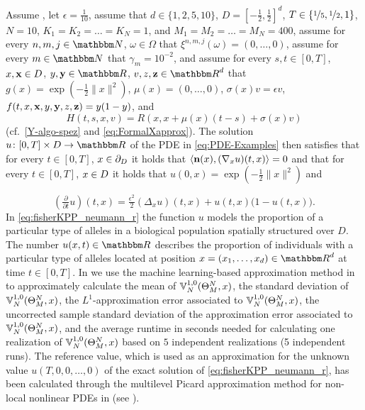 Assume ,
let 
$\epsilon = \tfrac{1}{10}$,
assume that
$d\in\{1,2,5,10\}$,
$D = [-\tfrac{1}{2},\tfrac{1}{2}]^d$,
$T\in\{\nicefrac{1}{5},\nicefrac{1}{2},1\}$,
$N=10$,
$K_1 = K_2 = \ldots = K_N= 1$, and
$M_1 = M_2 = \ldots = M_N = 400$,
assume for every 
$n,m,j\in \N$, $\omega \in \Omega$ 
that 
$\xi^{n,m,j}(\omega)=(0,\dots,0)$,
assume for every 
$m \in \N$
that
$\gamma_m = 10^{-2}$,
and assume for every 
$s,t \in [0,T]$,
$x,{\textbf x} \in D$,
$y,{\textbf y} \in \R$,
$v,z, {\textbf z} \in \R^d$ 
that
$g(x)=  \exp (-\tfrac{1}{2}\|x\|^2)$,
$\mu(x)=(0,\dots,0)$,
$\sigma(x) v =\epsilon v$, 
$f(t,x,{\textbf x},y,{\textbf y}, z, {\textbf z})= y(1-y)$, and
\begin{equation}
	H(t,s,x,v) = R(x,x+\mu(x)(t-s)+\sigma(x)v)
\end{equation} 
(cf.\ \eqref{Y-algo-spez} and \eqref{eq:FormalXapprox}).
The solution $u\colon[0,T]\times \D \to \R$ of the PDE in \eqref{eq:PDE-Examples} then satisfies that for every
$t\in [0,T]$, $x\in\partial_D$
it holds that
$\left<{\textbf n}(x) ,(\nabla_x u)(t,x)\right> = 0$
and that for every
$t\in [0,T]$, $x\in D$
it holds that
$u(0,x) =  \exp (-\tfrac{1}{2}\|x\|^2)$ and

\begin{equation}
    (\tfrac{\partial }{\partial t}u) (t,x) =
			\tfrac{\epsilon^2}{2}(\Delta_x u) (t,x) +
			u(t,x)\big(1 - u(t,x) \big).
    \label{eq:fisherKPP_neumann_r}
\end{equation}
% 
%
In \eqref{eq:fisherKPP_neumann_r} the function $u$ models the proportion of a particular type of alleles in a biological population spatially structured over $D$.
The number $u(x,t) \in \R$ describes the proportion of individuals with a particular type of alleles located at position $x = (x_1, \dots, x_d) \in \R^d$ at time $t \in [0,T]$.
In  
we use the machine learning-based approximation method
in 
to approximately calculate
the mean of %
$
{\mathbb{V}}^{1,0}_N(\Theta^N_M,x)
$,
the standard deviation of %
$
{\mathbb{V}}^{1,0}_N(\Theta^N_M,x)
$,
the $ L^1 $-approximation error associated to %
$
{\mathbb{V}}^{1,0}_N(\Theta^N_M,x)
$,
the uncorrected sample standard deviation of the approximation error associated to %
$
{\mathbb{V}}^{1,0}_N(\Theta^N_M,x)
$,
and the average runtime in seconds needed for calculating one realization of $
{\mathbb{V}}^{1,0}_N(\Theta^N_M,x)
$
%
based on $5$ independent realizations (5 independent runs).
%
The reference value, which is used as an approximation for the unknown value $u(T,0,0,\ldots,0)$ of the exact solution of \eqref{eq:fisherKPP_neumann_r}, has been calculated through the multilevel Picard approximation method for non-local nonlinear PDEs in  (see ).

